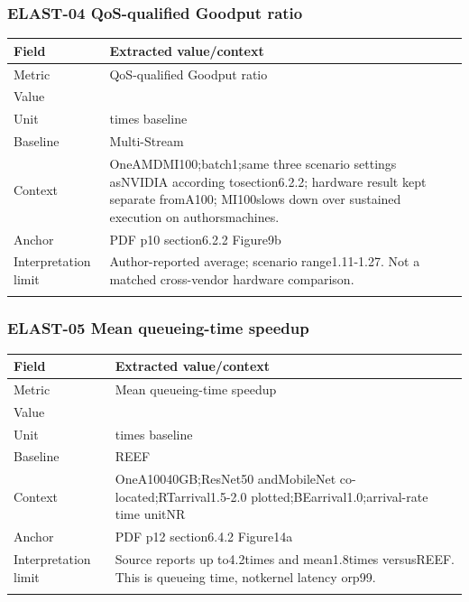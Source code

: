 \subsubsection*{ELAST-04 QoS-qualified Goodput ratio}
\begin{longtable}{>{\raggedright\arraybackslash}p{}>{\raggedright\arraybackslash}p{}}
\toprule
\textbf{Field} & \textbf{Extracted value/context}\\\midrule\endhead
Metric & QoS-qualified Goodput ratio\\\addlinespace
Value & 1.17\\\addlinespace
Unit & times baseline\\\addlinespace
Baseline & Multi-Stream\\\addlinespace
Context & OneAMDMI100;\allowbreak{}batch1;\allowbreak{}same three scenario settings asNVIDIA according tosection6.2.2;\allowbreak{} hardware result kept separate fromA100;\allowbreak{} MI100slows down over sustained execution on authorsmachines.\\\addlinespace
Anchor & PDF p10 section6.2.2 Figure9b\\\addlinespace
Interpretation limit & Author-reported average;\allowbreak{} scenario range1.11-1.27. Not a matched cross-vendor hardware comparison.\\\addlinespace
\bottomrule\end{longtable}
\subsubsection*{ELAST-05 Mean queueing-time speedup}
\begin{longtable}{>{\raggedright\arraybackslash}p{}>{\raggedright\arraybackslash}p{}}
\toprule
\textbf{Field} & \textbf{Extracted value/context}\\\midrule\endhead
Metric & Mean queueing-time speedup\\\addlinespace
Value & 1.8\\\addlinespace
Unit & times baseline\\\addlinespace
Baseline & REEF\\\addlinespace
Context & OneA10040GB;\allowbreak{}ResNet50 andMobileNet co-located;\allowbreak{}RTarrival1.5-2.0 plotted;\allowbreak{}BEarrival1.0;\allowbreak{}arrival-rate time unitNR\\\addlinespace
Anchor & PDF p12 section6.4.2 Figure14a\\\addlinespace
Interpretation limit & Source reports up to4.2times and mean1.8times versusREEF. This is queueing time,\allowbreak{} notkernel latency orp99.\\\addlinespace
\bottomrule\end{longtable}
